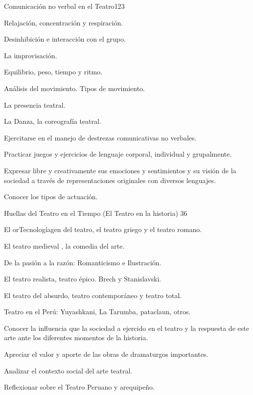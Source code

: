 \begin{syllabus}
\begin{unit}{Comunicación no verbal en el Teatro}{}{12}{3}
\begin{topics}
	\item Relajación, concentración y respiración.
	\item Desinhibición e interacción con el grupo.
	\item La improvisación. 
	\item Equilibrio, peso, tiempo y ritmo. 
	\item Análisis del movimiento. Tipos de movimiento.
	\item La presencia teatral.
	\item La Danza, la coreografía teatral.     

\end{topics}
\begin{learningoutcomes}
	\item Ejercitarse en el manejo de destrezas comunicativas no verbales.
	\item Practicar juegos y ejercicios de lenguaje  corporal, individual y grupalmente.
	\item Expresar libre y creativamente sus emociones y sentimientos y su visión de la sociedad  a través de representaciones originales con diversos lenguajes. 
	\item Conocer los tipos de actuación.
\end{learningoutcomes}
\end{unit}

\begin{unit}{Huellas del Teatro en el Tiempo  (El Teatro en la historia) }{}{3}{6}
\begin{topics}
	\item El orTecnologíagen del teatro, el teatro griego y el teatro romano.
	\item El teatro medieval , la comedia del arte.
	\item De la pasión a la razón: Romanticismo e Ilustración.
	\item El teatro realista, teatro épico. Brech  y  Stanislavski.
	\item El teatro del absurdo, teatro contemporáneo y teatro total.
	\item Teatro en el Perú: Yuyashkani, La Tarumba, pataclaun, otros.
\end{topics}
\begin{learningoutcomes}
	\item Conocer la influencia que la sociedad a ejercido en el teatro y la respuesta de este arte ante los diferentes momentos de la historia.
	\item Apreciar el valor y aporte de las obras de dramaturgos importantes. 
	\item Analizar el contexto social del arte teatral.
	\item Reflexionar sobre el Teatro Peruano y arequipeño.
\end{learningoutcomes}
\end{unit}


\end{syllabus}
